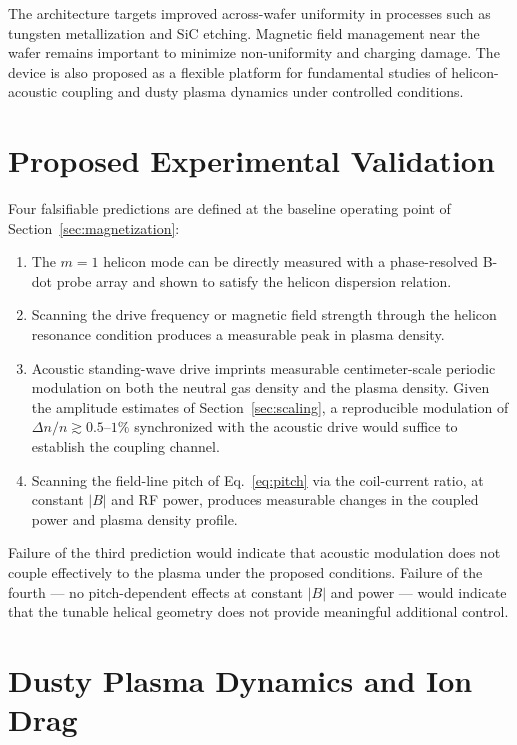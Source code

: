 \documentclass[11pt]{article}
\begin{document}
The architecture targets improved across-wafer uniformity in processes such as tungsten metallization and SiC etching. Magnetic field management near the wafer remains important to minimize non-uniformity and charging damage. The device is also proposed as a flexible platform for fundamental studies of helicon-acoustic coupling and dusty plasma dynamics under controlled conditions.

\section{Proposed Experimental Validation}
\label{sec:validation}

Four falsifiable predictions are defined at the baseline operating point of Section~\ref{sec:magnetization}:

\begin{enumerate}
    \item The $m=1$ helicon mode can be directly measured with a phase-resolved B-dot probe array \cite{hutchinson} and shown to satisfy the helicon dispersion relation.
    \item Scanning the drive frequency or magnetic field strength through the helicon resonance condition produces a measurable peak in plasma density.
    \item Acoustic standing-wave drive imprints measurable centimeter-scale periodic modulation on both the neutral gas density and the plasma density. Given the amplitude estimates of Section~\ref{sec:scaling}, a reproducible modulation of $\Delta n/n \gtrsim 0.5$--$1\%$ synchronized with the acoustic drive would suffice to establish the coupling channel.
    \item Scanning the field-line pitch of Eq.~\eqref{eq:pitch} via the coil-current ratio, at constant $|B|$ and RF power, produces measurable changes in the coupled power and plasma density profile.
\end{enumerate}

Failure of the third prediction would indicate that acoustic modulation does not couple effectively to the plasma under the proposed conditions. Failure of the fourth --- no pitch-dependent effects at constant $|B|$ and power --- would indicate that the tunable helical geometry does not provide meaningful additional control.

\section{Dusty Plasma Dynamics and Ion Drag}
\end{document}
